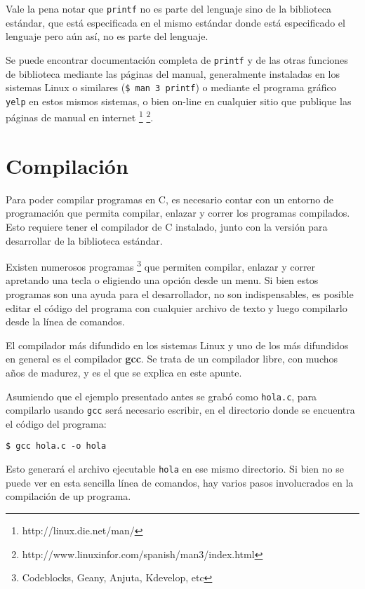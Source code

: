 Vale la pena notar que \lstinline!printf! no es parte del lenguaje sino de la
biblioteca estándar, que está especificada en el mismo estándar donde está
especificado el lenguaje pero aún así, no es parte del lenguaje.

Se puede encontrar documentación completa de \lstinline!printf! y de las otras
funciones de biblioteca mediante las páginas del manual, generalmente
instaladas en los sistemas Linux o similares (\verb!$ man 3 printf!) o
mediante el programa gráfico \verb!yelp! en estos mismos sistemas, o bien
on-line en cualquier sitio que publique las páginas de manual en internet
\footnote{http://linux.die.net/man/}
\footnote{http://www.linuxinfor.com/spanish/man3/index.html}.

\section{Compilación}

Para poder compilar programas en C, es necesario contar con un entorno de
programación que permita compilar, enlazar y correr los programas compilados.
Esto requiere tener el compilador de C instalado, junto con la versión para
desarrollar de la biblioteca estándar.

Existen numerosos programas \footnote{Codeblocks, Geany, Anjuta, Kdevelop,
etc} que permiten compilar, enlazar y correr apretando una tecla o eligiendo
una opción desde un menu.  Si bien estos programas son una ayuda para el
desarrollador, no son indispensables, es posible editar el código del programa
con cualquier archivo de texto y luego compilarlo desde la línea de comandos.

El compilador más difundido en los sistemas Linux y uno de los más difundidos
en general es el compilador \textbf{gcc}.  Se trata de un compilador libre,
con muchos años de madurez, y es el que se explica en este apunte.

Asumiendo que el ejemplo presentado antes se grabó como \verb!hola.c!, para
compilarlo usando \verb!gcc! será necesario escribir, en el directorio donde
se encuentra el código del programa:

\begin{verbatim}
$ gcc hola.c -o hola
\end{verbatim}

Esto generará el archivo ejecutable \verb!hola! en ese mismo directorio.  Si
bien no se puede ver en esta sencilla línea de comandos, hay varios pasos
involucrados en la compilación de up programa.

